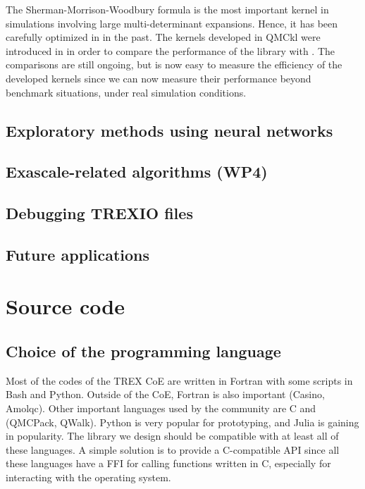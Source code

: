 The Sherman-Morrison-Woodbury formula is the most important kernel in
simulations involving large multi-determinant expansions. Hence, it has
been carefully optimized in \qmcchem{} in the past. The kernels
developed in \ac{QMCkl} were introduced in \qmcchem{} in order
to compare the performance of the library with \qmcchem{}. The
comparisons are still ongoing, but is now easy to measure the
efficiency of the developed kernels since we can now measure their
performance beyond benchmark situations, under real simulation conditions.

\subsection{Exploratory methods using neural networks}

\subsection{Exascale-related algorithms (\ac{WP4})}

\subsection{Debugging TREXIO files}


\subsection{Future applications}




\section{Source code}

\subsection{Choice of the programming language}

Most of the codes of the \ac{TREX} \ac{CoE} are written in Fortran
with some scripts in Bash and Python. Outside of the
\ac{CoE}, Fortran is also important (Casino, Amolqc). Other
important languages used by the community are C and {\CC} (QMCPack,
QWalk). Python is very popular for prototyping, and Julia is gaining
in popularity\cite{poole_2020}. The library we design should be
compatible with at least all of these languages. A simple solution is
to provide a C-compatible \ac{API} since all these languages have a
\ac{FFI} for calling functions written in C, especially for
interacting with the operating system.

